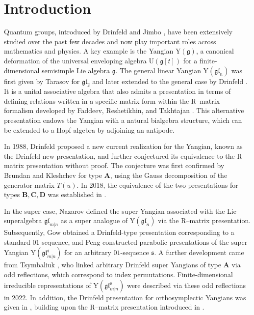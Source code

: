 \documentclass[a4paper,12pt]{article}
\numberwithin{equation}{section}
\begin{document}
\section{Introduction}
Quantum groups, introduced by Drinfeld \cite{D87} and Jimbo \cite{Ji85}, have been extensively studied over the past few decades and now play important roles across mathematics and physics. A key example is the Yangian $\mathrm{Y}(\mathfrak{g})$, a canonical deformation of the universal enveloping algebra $\mathrm{U}(\mathfrak{g}[t])$ for a finite-dimensional semisimple Lie algebra $\mathfrak{g}$. The general linear Yangian $\mathrm{Y}(\mathfrak{gl}_{n})$ was first given by Tarasov \cite{Ta84} for $\mathfrak{gl}_{2}$ and later extended to the general case by Drinfeld \cite{D85}. It is a unital associative algebra that also admits a presentation in terms of defining relations written in a specific matrix form within the R–matrix formalism developed by Faddeev, Reshetikhin, and Takhtajan \cite{FRT90}. This alternative presentation endows the Yangian with a natural bialgebra structure, which can be extended to a Hopf algebra by adjoining an antipode. 

In 1988, Drinfeld \cite{D88} proposed a new current realization for the Yangian, known as the Drinfeld new presentation, and further conjectured its equivalence to the R--matrix presentation without proof. 
The conjecture was first confirmed by Brundan and Kleshchev \cite{BK05} for type $\boldsymbol{A}$, using the Gauss decomposition of the generator matrix $T(u)$. In 2018, the equivalence of the two presentations for types $\boldsymbol{B},\boldsymbol{C},\boldsymbol{D}$ was established in \cite{JLM18}. 

In the super case, Nazarov \cite{N91} defined the super Yangian associated with the Lie superalgebra $\mathfrak{gl}_{m|n}$ as a super analogue of $\mathrm{Y}(\mathfrak{gl}_{n})$ via the R--matrix presentation. Subsequently, Gow \cite{G07} obtained a Drinfeld-type presentation corresponding to a standard $01$-sequence, and Peng \cite{P16} constructed parabolic presentations of the super Yangian $\mathrm{Y}(\mathfrak{gl}_{m|n}^{\mathfrak{s}})$ for an arbitrary $01$-sequence $\mathfrak{s}$. A further development came from Tsymbaliuk \cite{T20}, who linked arbitrary Drinfeld super Yangians of type $\boldsymbol{A}$ via odd reflections, which correspond to index permutations. Finite-dimensional irreducible representations of $\mathrm{Y}(\mathfrak{gl}_{m|n}^{\mathfrak{s}})$ were  described via these odd reflections \cite{L22, M22} in 2022. In addition, the Drinfeld presentation for orthosymplectic Yangians was given in \cite{M24}, building upon the R--matrix presentation introduced in \cite{AACFR03}.
\end{document}
